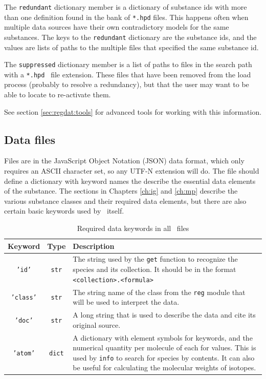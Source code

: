 The \texttt{redundant} dictionary member is a dictionary of substance ids with more than one definition found in the bank of \texttt{*.hpd} files.  This happens often when multiple data sources have their own contradictory models for the same substances.  The keys to the \texttt{redundant} dictionary are the substance ids, and the values are lists of paths to the multiple files that specified the same substance id.

The \texttt{suppressed} dictionary member is a list of paths to files in the search path with a \texttt{*.hpd~} file extension.  These files that have been removed from the load process (probably to resolve a redundancy), but that the user may want to be able to locate to re-activate them.

See section \ref{sec:regdat:tools} for advanced tools for working with this information.

\subsection{Data files}\label{sec:regdat:data}

Files are in the JavaScript Object Notation (JSON) data format, which only requires an ASCII character set, so any UTF-N extension will do.  The file should define a dictionary with keyword names the describe the essential data elements of the substance.  The sections in Chapters \ref{ch:ig} and \ref{ch:mp} describe the various substance classes and their required data elements, but there are also certain basic keywords used by \PM\ itself.

\begin{table}
\centering
\caption{Required data keywords in all \PM\ files}\label{tab:data:required}
\begin{tabular}{|ccp{2.5in}|}
\hline
Keyword & Type & Description\\
\hline
\texttt{'id'} & \texttt{str} & The string used by the \texttt{get} function to recognize the species and its collection.  It should be in the format \texttt{<collection>.<formula>}\\
\texttt{'class'} & \texttt{str} & The string name of the class from the \texttt{reg} module that will be used to interpret the data.\\
\texttt{'doc'} & \texttt{str} & A long string that is used to describe the data and cite its original source.\\
\texttt{'atom'} & \texttt{dict} & A dictionary with element symbols for keywords, and the numerical quantity per molecule of each for values.  This is used by \texttt{info} to search for species by contents.  It can also be useful for calculating the molecular weights of isotopes.\\
\hline
\end{tabular}
\end{table}

